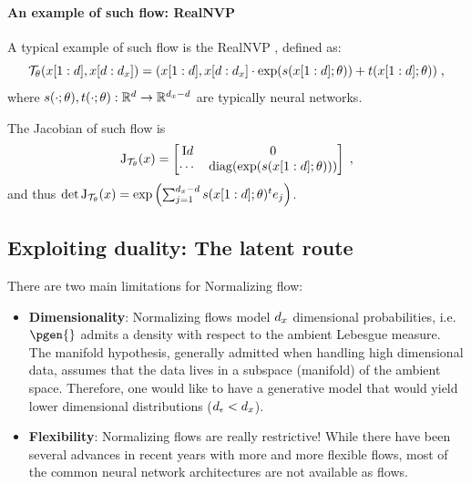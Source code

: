 \paragraph{An example of such flow: RealNVP}
A typical example of such flow is the RealNVP \cite{dinh2017density}, defined as:
\begin{equation}
    \label{eq:rnvp_def}
    \mathcal{T}_{\theta}(x[1:d], x[d:{d_x}]) = (x[1:d], x[d:{d_x}] \cdot \exp(s(x[1:d]; \theta)) + t(x[1:d]; \theta)) \;,
\end{equation}
where $s(\cdot; \theta), t(\cdot; \theta): \mathbb{R}^d \rightarrow \mathbb{R}^{{d_x} - d}$ are typically neural networks.

The Jacobian of such flow is
\begin{equation}
    \label{eq:rnvp_jac}
    \mathrm{J}_{\mathcal{T}_{\theta}}(x) = \begin{bmatrix}
        \mathrm{I}{d} & 0 \\
        \cdots & \operatorname{diag}(\exp(s(x[1:d]; \theta)))
    \end{bmatrix}\;,
\end{equation}
and thus $\det \mathrm{J}_{\mathcal{T}_{\theta}}(x) = \exp\left(\sum_{j=1}^{{d_x} - d} s(x[1:d]; \theta)^t e_j\right)$.

\subsection{Exploiting duality: The latent route}

There are two main limitations for Normalizing flow:
\begin{itemize}
    \item \textbf{Dimensionality}: Normalizing flows model ${d_x}$ dimensional probabilities, i.e. $\pgen{}$ admits a density with respect to the ambient Lebesgue measure. The manifold hypothesis, generally admitted when handling high dimensional data, assumes that the data lives in a subspace (manifold) of the ambient space.
    Therefore, one would like to have a generative model that would yield lower dimensional distributions ($d_{\epsilon} < {d_x}$). 
    \item \textbf{Flexibility}: Normalizing flows are really restrictive! While there have been several advances in recent years with more and more flexible flows, most of the common neural network architectures are not available as flows.
\end{itemize}

